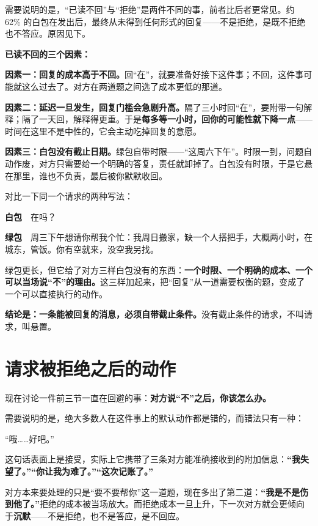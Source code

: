 需要说明的是，“已读不回”与“拒绝”是两件不同的事，前者比后者更常见。约 62\% 的白包在发出后，最终从未得到任何形式的回复——不是拒绝，是既不拒绝也不答应。原因见下。

\textbf{已读不回的三个因素：}

\textbf{因素一：回复的成本高于不回。}回“在”，就要准备好接下这件事；不回，这件事可能就这么过去了。对方在两道题之间选了成本更低的那道。

\textbf{因素二：延迟一旦发生，回复门槛会急剧升高。}隔了三小时回“在”，要附带一句解释；隔了一天回，解释得更重。于是\textbf{每多等一小时，回你的可能性就下降一点}——时间在这里不是中性的，它会主动吃掉回复的意愿。

\textbf{因素三：白包没有截止日期。}绿包自带时限——“这周六下午”。时限一到，问题自动作废，对方只需要给一个明确的答复，责任就卸掉了。白包没有时限，于是它悬在那里，谁也不负责，最后被你默默收回。

对比一下同一个请求的两种写法：

\begin{mdquote}
\textbf{白包}　在吗？

\textbf{绿包}　周三下午想请你帮我个忙：我周日搬家，缺一个人搭把手，大概两小时，在城东，管饭。你有空就来，没空我另找。
\end{mdquote}

绿包更长，但它给了对方三样白包没有的东西：\textbf{一个时限、一个明确的成本、一个可以当场说“不”的理由。}这三样加起来，把“回复”从一道需要权衡的题，变成了一个可以直接执行的动作。

\textbf{结论是：一条能被回复的消息，必须自带截止条件。}没有截止条件的请求，不叫请求，叫悬置。

\section{请求被拒绝之后的动作}

现在讨论一件前三节一直在回避的事：\textbf{对方说“不”之后，你该怎么办。}

需要说明的是，绝大多数人在这件事上的默认动作都是错的，而错法只有一种：

\begin{mdquote}
“哦……好吧。”
\end{mdquote}

这句话表面上是接受，实际上它携带了三条对方能准确接收到的附加信息：\textbf{“我失望了。”“你让我为难了。”“这次记账了。”}

对方本来要处理的只是“要不要帮你”这一道题，现在多出了第二道：\textbf{“我是不是伤到他了。”}拒绝的成本被当场放大。而拒绝成本一旦上升，下一次对方就会更倾向于\textbf{沉默}——不是拒绝，也不是答应，是不回应。

